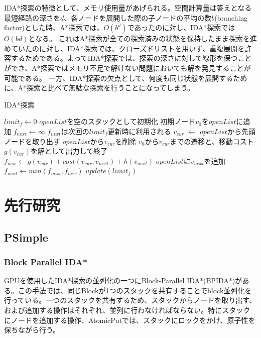 \documentclass[a4paper,11pt,oneside,openany]{jsbook}
\begin{document}
IDA*探索の特徴として、メモリ使用量があげられる。空間計算量は答えとなる最短経路の深さを$d$、各ノードを展開した際の子ノードの平均の数$b$(branching factor)とした時、A*探索では、$O(b^d)$であったのに対し、IDA*探索では$O(bd)$となる。
これはA*探索が全ての探索済みの状態を保持したまま探索を進めていたのに対し、IDA*探索では、クローズドリストを用いず、重複展開を許容するためである。よってIDA*探索では、探索の深さに対して線形を保つことができ、A*探索ではメモリ不足で解けない問題においても解を発見することが可能である。
一方、IDA*探索の欠点として、何度も同じ状態を展開するために、A*探索と比べて無駄な探索を行うことになってしまう。

\begin{algorithm}
\caption{IDA*探索}
\label{alg:pbnf}
\begin{algorithmic}[1]
\State $limit_f \leftarrow 0$
    \State $openList$を空のスタックとして初期化
    \State 初期ノード$v_0$を$openList$に追加
    \State $f_{next} \leftarrow \infty$
    \State $f_{next}$は次回の$limit_f$更新時に利用される 
        \State $v_{cur}$ $\leftarrow$ $openList$から先頭ノードを取り出す
        \State $openList$から$v_{cur}$を削除
            \State $v_0$から$v_{cur}$までの遷移と、移動コスト$g(v_{cur})$を解として出力して終了
        \EndIf
            \State $f_{new} \leftarrow g(v_{cur}) + cost(v_{cur}, v_{next}) + h(v_{next})$
                \State $openList$に$v_{next}$を追加
            \Else
                \State $f_{next} \leftarrow min(f_{next}, f_{new})$
            \EndIf
        \EndFor
    \EndWhile
    \State $update(limit_f)$
\EndWhile
\end{algorithmic}
\end{algorithm}
\newpage



\chapter{先行研究}
\section{PSimple}

\subsection{Block Parallel IDA*}
GPUを使用したIDA*探索の並列化の一つにBlock-Parallel IDA*(BPIDA*)\cite{Horie17}がある。この手法では、同じBlockが1つのスタックを共有することでblock並列化を行っている。一つのスタックを共有するため、スタックからノードを取り出す、および追加する操作はそれぞれ、並列に行わなければならない。特にスタックにノードを追加する操作、AtomicPutでは、スタックにロックをかけ、原子性を保ちながら行う。
\end{document}
